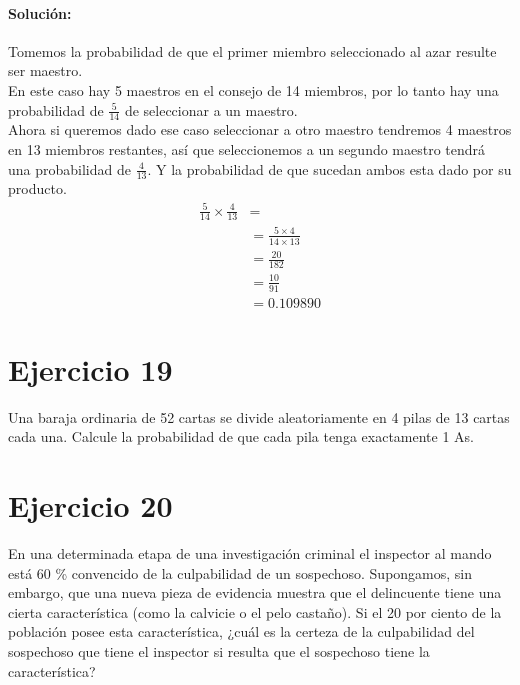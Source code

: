 \documentclass[12pt]{article}
\begin{document}
\paragraph{Solución: } Tomemos la probabilidad de que el primer miembro seleccionado al azar resulte ser maestro.\\
En este caso hay 5 maestros en el consejo de 14 miembros, por lo tanto hay una probabilidad de $\frac{5}{14}$ de seleccionar a un maestro.\\
Ahora si queremos dado ese caso seleccionar a otro maestro tendremos 4 maestros en 13 miembros restantes, así que seleccionemos a un segundo maestro tendrá una probabilidad de $\frac{4}{13}$.
Y la probabilidad de que sucedan ambos esta dado por su producto.\\
\begin{equation}
	\begin{split}
	\frac{5}{14} \times \frac{4}{13}&=\\
	&=\frac{5\times 4}{14 \times 13} \\
	&=\frac{20}{182} \\
	&=\frac{10}{91}\\
	&= 0.109890
	\end{split}
\end{equation}
\section{Ejercicio 19}
Una baraja ordinaria de 52 cartas se divide aleatoriamente en 4 pilas de 13 cartas cada una.
Calcule la probabilidad de que cada pila tenga exactamente 1 As.
\section{Ejercicio 20}
 En una determinada etapa de una investigación criminal el inspector al mando está 60 \%
convencido de la culpabilidad de un sospechoso. Supongamos, sin embargo, que una nueva
pieza de evidencia muestra que el delincuente tiene una cierta característica (como la calvicie
o el pelo castaño). Si el 20 por ciento de la población posee esta característica, ¿cuál es la
certeza de la culpabilidad del sospechoso que tiene el inspector si resulta que el sospechoso
tiene la característica?\\
\end{document}
